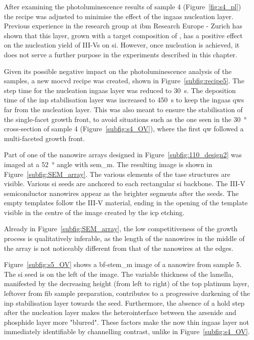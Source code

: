 After examining the photoluminescence results of sample 4 (Figure~\ref{fig:s4_pl}) the recipe was adjusted to minimise the effect of the \acs{ingaas} nucleation layer. Previous experience in the research group at \acs{ibm} Research Europe - Zurich has shown that this layer, grown with a target composition of , has a positive effect on the nucleation yield of III-Vs on \acs{si}. However, once nucleation is achieved, it does not serve a further purpose in the experiments described in this chapter. 

Given its possible negative impact on the photoluminescence analysis of the samples, a new \acf{mocvd} recipe was created, shown in Figure~\ref{subfig:recipe5}. The step time for the nucleation \acs{ingaas} layer was reduced to \qty{30}{\second}. The deposition time of the \acs{inp} stabilisation layer was increased to \qty{450}{\second} to keep the \acs{ingaas} \acl{qw}s far from the nucleation layer. This was also meant to ensure the stabilisation of the single-facet  growth front, to avoid situations such as the one seen in the \qty{30}{\degree} cross-section of sample 4 (Figure~\ref{subfig:s4_OV}), where the first \acl{qw} followed a multi-faceted growth front. 

Part of one of the nanowire arrays designed in Figure~\ref{subfig:110_design2} was imaged at a \qty{52}{\degree} angle with \acs{sem_m}. The resulting image is shown in Figure~\ref{subfig:SEM_array}. The various elements of the \acs{tase} structures are visible. Various \acs{si} seeds are anchored to each rectangular \acs{si} backbone. The III-V semiconductor nanowires appear as the brighter segments after the seeds. The empty templates follow the III-V material, ending in the opening of the template visible in the centre of the image created by the \acf{icp} etching. 

Already in Figure~\ref{subfig:SEM_array}, the low competitiveness of the growth process is qualitatively inferable, as the length of the nanowires in the middle of the array is not noticeably different from that of the nanowires at the edges.

Figure~\ref{subfig:s5_OV} shows a \acs{bf}-\acs{stem_m} image of a nanowire from sample 5. The \acs{si} seed is on the left of the image. The variable thickness of the lamella, manifested by the decreasing height (from left to right) of the top platinum layer, leftover from \acs{fib} sample preparation, contributes to a progressive darkening of the \acs{inp} stabilisation layer towards the seed. Furthermore, the absence of a hold step after the nucleation layer makes the heterointerface between the arsenide and phosphide layer more "blurred". These factors make the now thin \acs{ingaas} layer not immediately identifiable by channelling contrast, unlike in Figure~\ref{subfig:s4_OV}.

